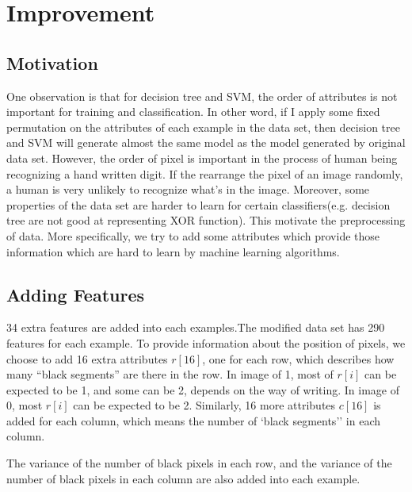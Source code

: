 \documentclass[a4paper,11pt]{article}
\begin{document}
\section{Improvement}
\subsection{Motivation}
One observation is that for decision tree and SVM, the order of attributes is not important for training and classification. In other word, if I apply some fixed permutation on the attributes of each example in the data set, then decision tree and SVM will generate almost the same model as the model generated by original data set.
However, the order of pixel is important in the process of human being recognizing a hand written digit. If the rearrange the pixel of an image randomly, a human is very unlikely to recognize what's in the image.
Moreover, some properties of the data set are harder to learn for certain classifiers(e.g. decision tree are not good at representing XOR function).
This motivate the preprocessing of data. More specifically, we try to add some attributes which provide those information which are hard to learn by machine learning algorithms.
\subsection{Adding Features}
34 extra features are added into each examples.The modified data set has 290 features for each example.
To provide information about the position of pixels, we choose to add 16 extra attributes $r[16]$, one for each row, which describes how many ``black segments'' are there in the row. In image of 1, most of $r[i]$ can be expected to be 1, and some can be 2, depends on the way of writing. In image of 0, most $r[i]$ can be expected to be 2.
Similarly, 16 more attributes $c[16]$ is added for each column, which means the number of `black segments'' in each column.

The variance of the number of black pixels in each row, and the variance of the number of black pixels in each column are also added into each example.
\end{document}
